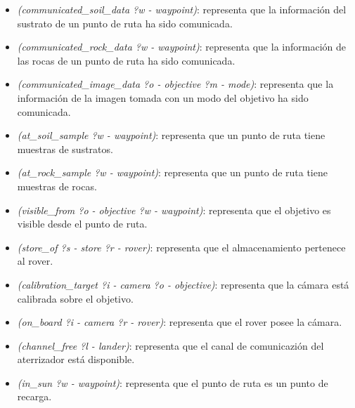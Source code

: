 \documentclass{uc3mpracticas}
\begin{document}
\begin{itemize}
    \item \textit{(communicated\_soil\_data ?w - waypoint)}: representa que la información del sustrato de un punto de ruta ha sido comunicada.
    \item \textit{(communicated\_rock\_data ?w - waypoint)}: representa que la información de las rocas de un punto de ruta ha sido comunicada.
    \item \textit{(communicated\_image\_data ?o - objective ?m - mode)}: representa que la información de la imagen tomada con un modo del objetivo ha sido comunicada.
    \item \textit{(at\_soil\_sample ?w - waypoint)}: representa que un punto de ruta tiene muestras de sustratos.
    \item \textit{(at\_rock\_sample ?w - waypoint)}: representa que un punto de ruta tiene muestras de rocas.
    \item \textit{(visible\_from ?o - objective ?w - waypoint)}: representa que el objetivo es visible desde el punto de ruta.
    \item \textit{(store\_of ?s - store ?r - rover)}: representa que el almacenamiento pertenece al rover.
    \item \textit{(calibration\_target ?i - camera ?o - objective)}: representa que la cámara está calibrada sobre el objetivo.
    \item \textit{(on\_board ?i - camera ?r - rover)}: representa que el rover posee la cámara.
    \item \textit{(channel\_free ?l - lander)}: representa que el canal de comunicazión del aterrizador está disponible.
    \item \textit{(in\_sun ?w - waypoint)}: representa que el punto de ruta es un punto de recarga.
  \end{itemize}
\end{document}
